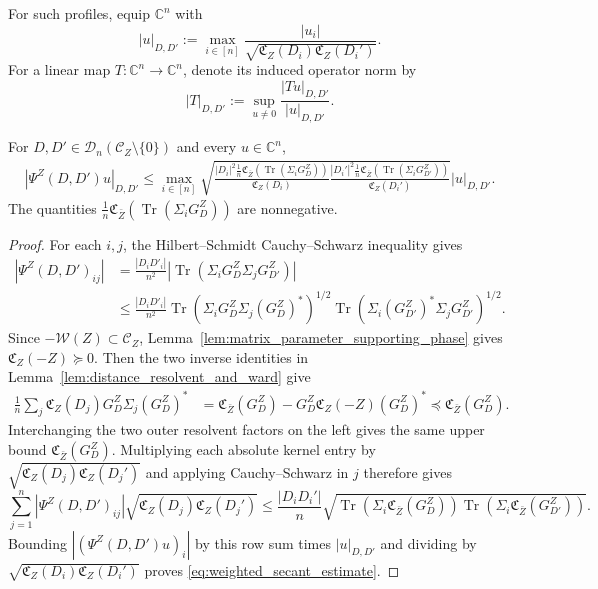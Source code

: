 \documentclass[EJP, preprint, NODS, nobera, nofontexpansion]{ejpecp}
\DeclareMathOperator{\tr}{Tr}
\begin{document}
For such profiles, equip
\(\mathbb C^n\) with
\[
    |u|_{D,D'}
    :=
    \max_{i\in[n]}
    \frac{|u_i|}
    {\sqrt{\mathfrak C_Z(D_i)\mathfrak C_Z(D_i')}}.
\]
For a linear map \(T:\mathbb C^n\to\mathbb C^n\), denote its induced
operator norm by
\[
    |T|_{D,D'}
    :=
    \sup_{u\neq0}
    \frac{|Tu|_{D,D'}}{|u|_{D,D'}}.
\]

\begin{lemma}
\label{lem:weighted_secant_estimate}
For \(D,D'\in\mathcal D_n(\mathcal C_Z\setminus\{0\})\) and every
\(u\in\mathbb C^n\),
\begin{multline}\label{eq:weighted_secant_estimate}
    |\Psi^Z(D,D')u|_{D,D'}
    \leq
    \max_{i\in[n]}
    \sqrt{
        \frac{|D_i|^2\frac1n\mathfrak C_{\bar Z}\!\left(\tr(\Sigma_iG_D^Z)\right)}{\mathfrak C_Z(D_i)}
        \frac{|D_i'|^2\frac1n\mathfrak C_{\bar Z}\!\left(\tr(\Sigma_iG_{D'}^Z)\right)}{\mathfrak C_Z(D_i')}
    }
    |u|_{D,D'}.
\end{multline}
The quantities
\(\frac1n\mathfrak C_{\bar Z}\!\left(\tr(\Sigma_iG_D^Z)\right)\)
are nonnegative.
\end{lemma}

\begin{proof}
For each \(i,j\), the Hilbert--Schmidt Cauchy--Schwarz inequality gives
\begin{align*}
|\Psi^Z(D,D')_{ij}|
&=\frac{|D_iD'_i|}{n^2}\left|
    \tr(\Sigma_iG_D^Z\Sigma_jG_{D'}^Z)
\right|\\
&\leq
\frac{|D_iD'_i|}{n^2}\tr\!\left(
    \Sigma_iG_D^Z\Sigma_j(G_D^Z)^*
\right)^{1/2}
\tr\!\left(
    \Sigma_i(G_{D'}^Z)^*\Sigma_jG_{D'}^Z
\right)^{1/2}.
\end{align*}
Since \(-\mathcal W(Z)\subset\mathcal C_Z\),
Lemma~\ref{lem:matrix_parameter_supporting_phase} gives $\mathfrak C_Z(-Z)\succeq0$. 
Then the two inverse identities in
Lemma~\ref{lem:distance_resolvent_and_ward} give
\begin{align*}
    \frac1n\sum_j\mathfrak C_Z(D_j)
        G_D^Z\Sigma_j(G_D^Z)^*
    &=\mathfrak C_{\bar Z}(G_D^Z)
        -G_D^Z\mathfrak C_Z(-Z)(G_D^Z)^*
    \preceq \mathfrak C_{\bar Z}(G_D^Z).
\end{align*}
Interchanging the two outer resolvent factors on the left gives the same
upper bound \(\mathfrak C_{\bar Z}(G_D^Z)\).
Multiplying each absolute kernel entry by
$\sqrt{\mathfrak C_Z(D_j)\mathfrak C_Z(D_j')}$ and applying Cauchy--Schwarz in $j$
therefore gives
\[
    \sum_{j=1}^n|\Psi^Z(D,D')_{ij}|
       \sqrt{\mathfrak C_Z(D_j)\mathfrak C_Z(D_j')}
    \leq
    \frac{|D_iD_i'|}{n}
    \sqrt{
        \tr(\Sigma_i\mathfrak C_{\bar Z}(G_D^Z))
        \tr(\Sigma_i\mathfrak C_{\bar Z}(G_{D'}^Z))
    }.
\]
Bounding
$|(\Psi^Z(D,D')u)_i|$ by this row sum times $|u|_{D,D'}$ and dividing by
\(\sqrt{\mathfrak C_Z(D_i)\mathfrak C_Z(D_i')}\) proves
\eqref{eq:weighted_secant_estimate}.
\end{proof}
\end{document}
